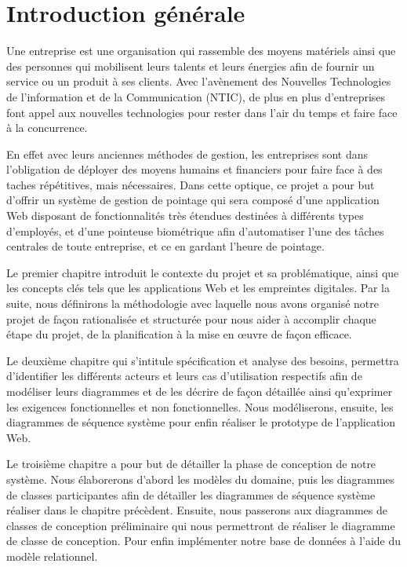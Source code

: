 \chapter*{Introduction générale}
\renewcommand{\headrulewidth}{1pt}
\onehalfspacing
\thispagestyle{empty}
    
Une entreprise est une organisation qui rassemble des moyens matériels ainsi que
des personnes qui mobilisent leurs talents et leurs énergies afin de fournir un
service ou un produit à ses clients. Avec l’avènement des Nouvelles Technologies
de l’information et de la Communication (NTIC), de plus en plus d’entreprises font
appel aux nouvelles technologies pour rester dans l’air du temps et faire face à
la concurrence.

En effet avec leurs anciennes méthodes de gestion, les entreprises sont dans
l’obligation de déployer des moyens humains et financiers pour faire face à des
taches répétitives, mais nécessaires. Dans cette optique, ce projet a pour but
d'offrir un système de
gestion de pointage qui sera composé d’une application Web disposant de
fonctionnalités très étendues destinées à différents types d’employés, et d’une
pointeuse biométrique afin d’automatiser l’une des tâches centrales de toute
entreprise, et ce en gardant l’heure de pointage.

Le premier chapitre introduit le contexte du projet et sa problématique, ainsi
que les concepts clés tels que les applications Web et les empreintes digitales.
Par la suite, nous définirons la méthodologie avec laquelle nous avons organisé
notre projet de façon rationalisée et structurée pour nous aider à accomplir
chaque étape du projet, de la planification à la mise en œuvre de façon
efficace.

Le deuxième chapitre qui s’intitule spécification et analyse des besoins,
permettra d’identifier les différents acteurs et leurs cas d’utilisation
respectifs afin de modéliser leurs diagrammes et de les décrire de façon
détaillée ainsi qu’exprimer les exigences fonctionnelles et non fonctionnelles.
Nous modéliserons, ensuite, les diagrammes de séquence système pour enfin
réaliser le prototype de l’application Web.

Le troisième chapitre a pour but de détailler la phase de conception de notre
système. Nous élaborerons d’abord les modèles du domaine, puis les diagrammes de
classes participantes afin de détailler les diagrammes de séquence système
réaliser dans le chapitre précèdent. Ensuite, nous passerons aux diagrammes de
classes de conception préliminaire qui nous permettront de réaliser le diagramme de
classe de conception. Pour enfin
implémenter notre base de données à l’aide du modèle relationnel. 

